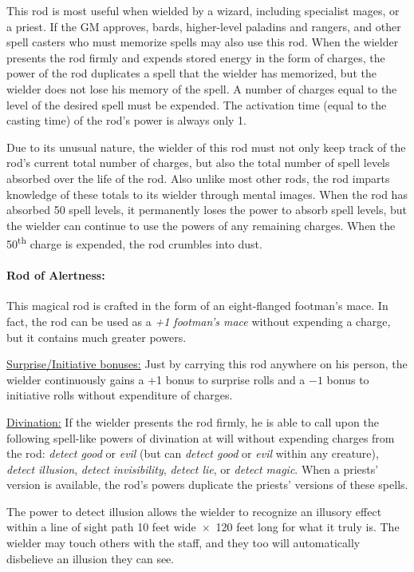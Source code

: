 \begin{multicols}{2}
This rod is most useful when wielded by a wizard, including specialist mages, or a priest.  If the GM approves, bards, higher-level paladins and rangers, and other spell casters who must memorize spells may also use this rod.  When the wielder presents the rod firmly and expends stored energy in the form of charges, the power of the rod duplicates a spell that the wielder has memorized, but the wielder does not lose his memory of the spell.  A number of charges equal to the level of the desired spell must be expended.  The activation time (equal to the casting time) of the rod's power is always only 1.  

Due to its unusual nature, the wielder of this rod must not only keep track of the rod's current total number of charges, but also the total number of spell levels absorbed over the life of the rod.  Also unlike most other rods, the rod imparts knowledge of these totals to its wielder through mental images.  When the rod has absorbed 50 spell levels, it permanently loses the power to absorb spell levels, but the wielder can continue to use the powers of any remaining charges.  When the 50\textsuperscript{th} charge is expended, the rod crumbles into dust. 

\paragraph{Rod of Alertness:} This magical rod is crafted in the form of an eight-flanged footman's mace.  In fact, the rod can be used as a \textit{+1 footman's mace} without expending a charge, but it contains much greater powers.  

\underline{Surprise/Initiative bonuses:} Just by carrying this rod anywhere on his person, the wielder continuously gains a +1 bonus to surprise rolls and a $-1$ bonus to initiative rolls without expenditure of charges.  

\underline{Divination:} If the wielder presents the rod firmly, he is able to call upon the following spell-like powers of divination at will without expending charges from the rod: \textit{detect good} or \textit{evil} (but can \textit{detect good} or \textit{evil} within any creature), \textit{detect illusion}, \textit{detect invisibility}, \textit{detect lie}, or \textit{detect magic}.  When a priests' version is available, the rod's powers duplicate the priests' versions of these spells.

The power to detect illusion allows the wielder to recognize an illusory effect within a line of sight path 10 feet wide~$\times$~120 feet long for what it truly is.  The wielder may touch others with the staff, and they too will automatically disbelieve an illusion they can see.


\end{multicols}
